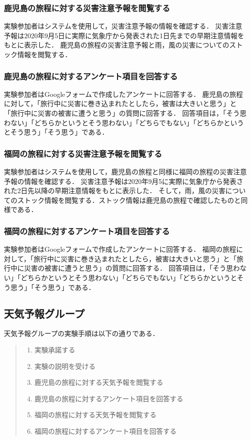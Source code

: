 \subsubsection{鹿児島の旅程に対する災害注意予報を閲覧する}
実験参加者はシステムを使用して，災害注意予報の情報を確認する．
災害注意予報は2020年9月5日に実際に気象庁から発表された1日先までの早期注意情報をもとに表示した．
鹿児島の旅程の災害注意予報と雨，風の災害についてのストック情報を閲覧する．

\subsubsection{鹿児島の旅程に対するアンケート項目を回答する}
実験参加者はGoogleフォームで作成したアンケートに回答する．
鹿児島の旅程に対して，「旅行中に災害に巻き込まれたとしたら，被害は大きいと思う」と「旅行中に災害の被害に遭うと思う」の質問に回答する．
回答項目は，「そう思わない」「どちらかというとそう思わない」「どちらでもない」「どちらかというとそう思う」「そう思う」である．

\subsubsection{福岡の旅程に対する災害注意予報を閲覧する}
実験参加者はシステムを使用して，鹿児島の旅程と同様に福岡の旅程の災害注意予報の情報を確認する．
災害注意予報は2020年9月5に実際に気象庁から発表された2日先以降の早期注意情報をもとに表示した．
そして，雨，風の災害についてのストック情報を閲覧する．ストック情報は鹿児島の旅程で確認したものと同様である．

\subsubsection{福岡の旅程に対するアンケート項目を回答する}
実験参加者はGoogleフォームで作成したアンケートに回答する．
福岡の旅程に対して，「旅行中に災害に巻き込まれたとしたら，被害は大きいと思う」と「旅行中に災害の被害に遭うと思う」の質問に回答する．
回答項目は，「そう思わない」「どちらかというとそう思わない」「どちらでもない」「どちらかというとそう思う」「そう思う」である．

\subsection{天気予報グループ}
天気予報グループの実験手順は以下の通りである．

\begin{quote}
  \begin{enumerate}
    \item 実験承諾する
    \item 実験の説明を受ける
    \item 鹿児島の旅程に対する天気予報を閲覧する
    \item 鹿児島の旅程に対するアンケート項目を回答する
    \item 福岡の旅程に対する天気予報を閲覧する
    \item 福岡の旅程に対するアンケート項目を回答する
  \end{enumerate}
\end{quote}

